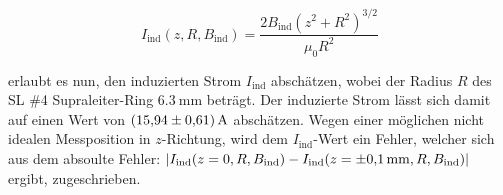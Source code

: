 \begin{equation*}
	I_{\text{ind}}(z,R,B_{\text{ind}}) = \frac{2B_{\text{ind}}(z^2+R^2)^{3/2}}{\mu_0R^2}
\label{AF6}
\end{equation*}

\noindent
erlaubt es nun, den induzierten Strom $I_{\text{ind}}$ abschätzen, wobei der
Radius $R$ des SL \#4 Supraleiter-Ring $\SI{6,3}{\milli\meter}$ beträgt. Der
induzierte Strom lässt sich damit auf einen Wert von $\SI{15,94\pm0.61}{\ampere}$
abschätzen. Wegen einer möglichen nicht idealen Messposition in $z$-Richtung,
wird dem $I_{\text{ind}}$-Wert ein Fehler, welcher sich aus dem absoulte Fehler:
$|I_{\text{ind}}(z=0,R,B_{\text{ind}}) - I_{\text{ind}}(z=\SI{\pm0.1}{\milli\meter},R,B_{\text{ind}})|$
ergibt, zugeschrieben.
